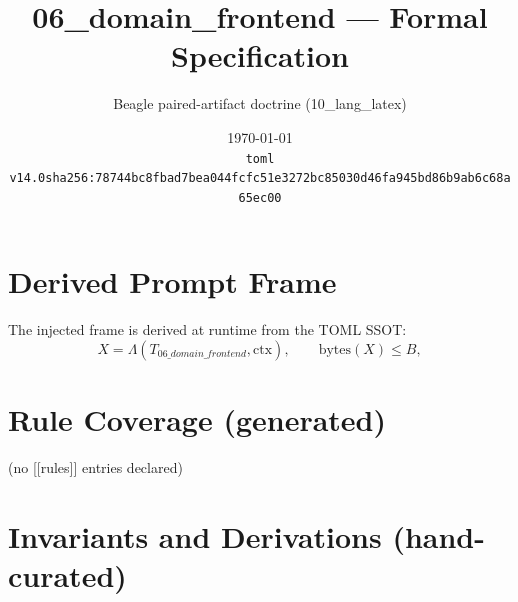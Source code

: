 \documentclass[11pt]{article}
\title{06\_domain\_frontend --- Formal Specification}
\author{Beagle paired-artifact doctrine (10\_lang\_latex)}
\date{\today\\ \texttt{toml v14.0\quad sha256:78744bc8fbad7bea044fcfc51e3272bc85030d46fa945bd86b9ab6c68a65ec00}}
\begin{document}
\maketitle

\section{Derived Prompt Frame}
The injected frame is derived at runtime from the TOML SSOT:
\begin{equation}
  X = \Lambda(T_{06\_domain\_frontend}, \mathrm{ctx}), \qquad \mathrm{bytes}(X) \le B,
  \label{lbl:derive-frame}
\end{equation}

\section{Rule Coverage (generated)}
(no [[rules]] entries declared)

\section{Invariants and Derivations (hand-curated)}
\end{document}
